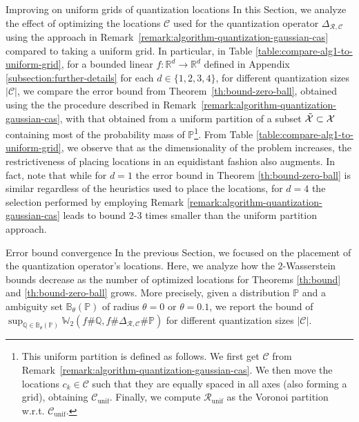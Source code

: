 \documentclass[11pt, a4paper, oneside,reqno]{amsart}
\makeatletter
\def\subsection{\@startsection{subsection}{2}%
	\z@{.5\linespacing\@plus.7\linespacing}{.5\linespacing}%
	{\normalfont\bfseries}}
\theoremstyle{plain}
\def\prob{\mathbb{P}}
\def\signature{{\Delta}}
\def\probQ{\mathbb{Q}}
\def\wasserstein{{\mathbb{W}}}
\def\realNum{{\mathbb{R}}}
\def\sX{{\mathcal{X}}}
\def\bsR{{\bm{\mathcal{R}}}}
\def\bsC{{\bm{\mathcal{C}}}}
\makeatother
\begin{document}
\subsection{Improving on uniform grids of quantization locations}\label{subsection:applying-loc-selection-algo}
In this Section, we analyze the effect of optimizing the locations \(\bsC\) used for the quantization operator \(\signature_{\bsR, \bsC}\) using the approach in Remark~\ref{remark:algorithm-quantization-gaussian-cas} compared to taking a uniform grid. 
In particular, in Table \ref{table:compare-alg1-to-uniform-grid}, for a bounded linear $f: \realNum^d \to \realNum^d$ defined in Appendix \ref{subsection:further-details} for each $d \in \{1,2,3,4\}$, for different quantization sizes $|\bsC|$, we compare
the error bound from Theorem~\ref{th:bound-zero-ball}, 
obtained using the the procedure described in Remark~\ref{remark:algorithm-quantization-gaussian-cas}, 
with that obtained from a uniform partition of a subset $\Tilde{\sX} \subset \sX$ containing most of the probability mass of $\prob$\footnote{This uniform partition is defined as follows. We first get $\bsC$ from Remark~\ref{remark:algorithm-quantization-gaussian-cas}. We then move the locations $c_k \in \bsC$ such that they are equally spaced in all axes (also forming a grid), obtaining $\bsC_{\text{unif}}$. Finally, we compute $\bsR_{\text{unif}}$ as the Voronoi partition w.r.t. $\bsC_{\text{unif}}$.}. From Table \ref{table:compare-alg1-to-uniform-grid}, we observe that as the dimensionality of the problem increases, the restrictiveness of placing locations in an equidistant fashion also augments. In fact, note that while for $d=1$ the error bound in Theorem \ref{th:bound-zero-ball} is similar regardless of the heuristics used to place the locations, for $d=4$ the selection performed by employing Remark \ref{remark:algorithm-quantization-gaussian-cas} leads to bound 2-3 times smaller than the uniform partition approach.

\subsection{Error bound convergence}\label{subsection:convergence}
In the previous Section, we focused on the placement of the quantization operator's locations. Here, we analyze how the $2$-Wasserstein bounds decrease as the number of optimized locations for Theorems \ref{th:bound} and \ref{th:bound-zero-ball} grows. More precisely, given a distribution $\prob$ and a ambiguity set $\mathbb{B}_\theta(\prob)$ of radius $\theta=0$ or $\theta=0.1$, we report the bound of $\sup_{\probQ \in \mathbb{B}_\theta(\prob)} \wasserstein_2(f\#\probQ, f\#\Delta_{\bsR, \bsC}\#\prob)$ for different quantization sizes $|\bsC|$. 
\end{document}
